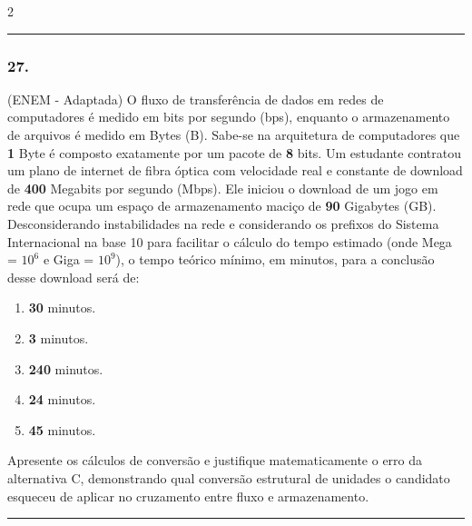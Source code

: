 \documentclass[twoside, 10pt, a4paper]{article}
\newlength{\espacoPreQuestao}\setlength{\espacoPreQuestao}{0.1cm}
\newlength{\espacoQuestao}\setlength{\espacoQuestao}{0.2cm}
\newlength{\espacoAlt}\setlength{\espacoAlt}{0.2cm}
\begin{document}
\begin{multicols*}{2}
\noindent\textcolor{CorLinha}{\rule{\linewidth}{0.5pt}} 
\par\vspace{\espacoPreQuestao}
\subsubsection*{27.} (ENEM - Adaptada) O fluxo de transferência de dados em redes de computadores é medido em bits por segundo (bps), enquanto o armazenamento de arquivos é medido em Bytes (B). Sabe-se na arquitetura de computadores que \textbf{1} Byte é composto exatamente por um pacote de \textbf{8} bits. Um estudante contratou um plano de internet de fibra óptica com velocidade real e constante de download de \textbf{400} Megabits por segundo (Mbps). Ele iniciou o download de um jogo em rede que ocupa um espaço de armazenamento maciço de \textbf{90} Gigabytes (GB). Desconsiderando instabilidades na rede e considerando os prefixos do Sistema Internacional na base 10 para facilitar o cálculo do tempo estimado (onde Mega = $10^6$ e Giga = $10^9$), o tempo teórico mínimo, em minutos, para a conclusão desse download será de:
\begin{enumerate}[label=\alph*), itemsep=\espacoAlt]
\item \textbf{30} minutos.
\item \textbf{3} minutos.
\item \textbf{240} minutos.
\item \textbf{24} minutos.
\item \textbf{45} minutos.
\end{enumerate}
Apresente os cálculos de conversão e justifique matematicamente o erro da alternativa C, demonstrando qual conversão estrutural de unidades o candidato esqueceu de aplicar no cruzamento entre fluxo e armazenamento.
\par\vspace{\espacoQuestao}

\noindent\textcolor{CorLinha}{\rule{\linewidth}{0.5pt}} 
\par\vspace{\espacoPreQuestao}

\end{multicols*}
\end{document}
